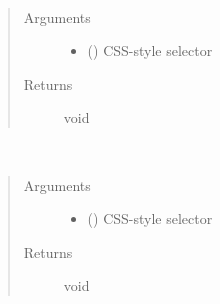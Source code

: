 \documentclass[a4paper,12pt,english]{sphinxmanual}
\begin{document}
\begin{fulllineitems}
\label{\detokenize{viewer/parameters:BIMDataViewer.show}}~\begin{quote}\begin{description}
\item[{Arguments}] \leavevmode\begin{itemize}
\item {} 
 () \textendash{} CSS-style selector

\end{itemize}

\item[{Returns}] \leavevmode
void

\end{description}\end{quote}

\end{fulllineitems}



\begin{fulllineitems}
\label{\detokenize{viewer/parameters:BIMDataViewer.hide}}~\begin{quote}\begin{description}
\item[{Arguments}] \leavevmode\begin{itemize}
\item {} 
 () \textendash{} CSS-style selector

\end{itemize}

\item[{Returns}] \leavevmode
void

\end{description}\end{quote}

\end{fulllineitems}
\end{document}
